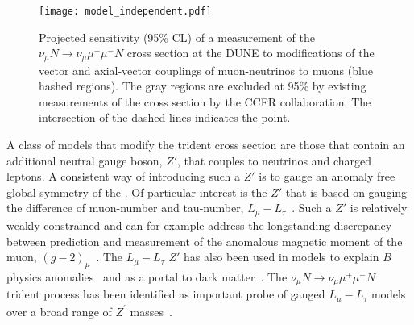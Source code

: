 \begin{figure}[tb!]
\centering
\texttt{[image: model\_independent.pdf]}
\caption[Projected sensitivity of $\nu_\mu N \to \nu_\mu \mu^+\mu^- N$ cross section at the  to modifications of the vector and axial-vector couplings of \numu{}s to muons]{Projected sensitivity (95\% CL) of a measurement of the $\nu_\mu N \to \nu_\mu \mu^+\mu^- N$ cross section at the DUNE   to modifications of the vector and axial-vector couplings of muon-neutrinos to muons (blue hashed regions). The gray regions are excluded at 95\%  by existing measurements of the cross section by the CCFR collaboration. The intersection of the dashed lines indicates the  point.}
\label{fig:trident_gVgA}
\end{figure}

A class of models that modify the trident cross section are those that contain an additional neutral gauge boson, $Z'$, that couples to neutrinos and charged leptons. A consistent way of introducing such a $Z'$ is to gauge an anomaly free global symmetry of the . Of particular interest is the $Z'$ that is based on gauging the difference of muon-number and tau-number, $L_\mu - L_\tau$~\cite{He:1990pn,He:1991qd}. Such a $Z'$ is relatively weakly constrained and can for example address the longstanding discrepancy between  prediction and measurement of the anomalous magnetic moment of the muon, $(g-2)_\mu$~\cite{Baek:2001kca,Harigaya:2013twa}. The $L_\mu - L_\tau$ $Z'$ has also been used in models to explain $B$ physics anomalies~\cite{Altmannshofer:2014cfa} and as a portal to dark matter~\cite{Baek:2008nz,Altmannshofer:2016jzy}. The $\nu_\mu N \to \nu_\mu \mu^+\mu^- N$ trident process has been identified as important probe of gauged $L_\mu - L_\tau$ models over a broad range of $Z^\prime$ masses~\cite{Altmannshofer:2014cfa,Altmannshofer:2014pba}.

